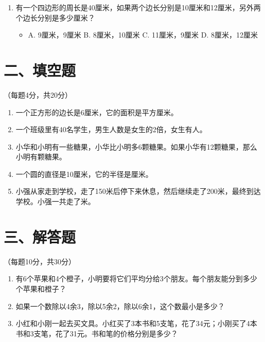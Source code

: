 \documentclass{article}
\begin{document}
\begin{enumerate}
    \item 有一个四边形的周长是40厘米，如果两个边长分别是10厘米和12厘米，另外两个边长分别是多少厘米？
    \begin{itemize}
        \item A. 9厘米，9厘米 \hspace{1cm} B. 8厘米，10厘米 \hspace{1cm} C. 11厘米，9厘米 \hspace{1cm} D. 8厘米，12厘米
    \end{itemize}
\end{enumerate}

\section*{二、填空题}（每题4分，共20分）

\begin{enumerate}
    \item 一个正方形的边长是6厘米，它的面积是\underline{\hspace{2cm}}平方厘米。
    \item 一个班级里有40名学生，男生人数是女生的2倍，女生有\underline{\hspace{2cm}}人。
    \item 小华和小明有一些糖果，小华比小明多6颗糖果。如果小华有12颗糖果，那么小明有\underline{\hspace{2cm}}颗糖果。
    \item 一个圆的直径是10厘米，它的半径是\underline{\hspace{2cm}}厘米。
    \item 小强从家走到学校，走了150米后停下来休息，然后继续走了200米，最终到达学校。小强一共走了\underline{\hspace{2cm}}米。
\end{enumerate}

\section*{三、解答题}（每题10分，共30分）

\begin{enumerate}
    \item 有6个苹果和4个橙子，小明要将它们平均分给3个朋友。每个朋友能分到多少个苹果和橙子？
    
    \item 如果一个数除以4余3，除以5余2，除以6余1，这个数最小是多少？
    
    \item 小红和小刚一起去买文具。小红买了3本书和5支笔，花了34元；小刚买了4本书和3支笔，花了31元。书和笔的价格分别是多少？
\end{enumerate}
\end{document}
